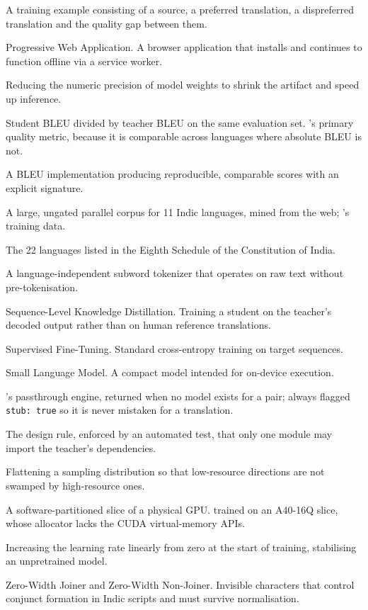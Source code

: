 {\begin{terms}
\item[Preference pair] A training example consisting of a source, a preferred translation, a dispreferred translation and the quality gap between them.
\item[PWA] Progressive Web Application. A browser application that installs and continues to function offline via a service worker.
\item[Quantisation] Reducing the numeric precision of model weights to shrink the artifact and speed up inference.
\item[Ratio (student/teacher)] Student BLEU divided by teacher BLEU on the same evaluation set. \setu{}'s primary quality metric, because it is comparable across languages where absolute BLEU is not.
\item[sacreBLEU] A BLEU implementation producing reproducible, comparable scores with an explicit signature.
\item[Samanantar] A large, ungated parallel corpus for 11 Indic languages, mined from the web; \setu{}'s training data.
\item[Scheduled languages] The 22 languages listed in the Eighth Schedule of the Constitution of India.
\item[SentencePiece] A language-independent subword tokenizer that operates on raw text without pre-tokenisation.
\item[\seqkd{}] Sequence-Level Knowledge Distillation. Training a student on the teacher's decoded output rather than on human reference translations.
\item[SFT] Supervised Fine-Tuning. Standard cross-entropy training on target sequences.
\item[SLM] Small Language Model. A compact model intended for on-device execution.
\item[Stub engine] \setu{}'s passthrough engine, returned when no model exists for a pair; always flagged \texttt{stub: true} so it is never mistaken for a translation.
\item[Teacher wall] The design rule, enforced by an automated test, that only one module may import the teacher's dependencies.
\item[Temperature sampling] Flattening a sampling distribution so that low-resource directions are not swamped by high-resource ones.
\item[vGPU] A software-partitioned slice of a physical GPU. \setu{} trained on an A40-16Q slice, whose allocator lacks the CUDA virtual-memory APIs.
\item[Warmup] Increasing the learning rate linearly from zero at the start of training, stabilising an unpretrained model.
\item[ZWJ / ZWNJ] Zero-Width Joiner and Zero-Width Non-Joiner. Invisible characters that control conjunct formation in Indic scripts and must survive normalisation.
\end{terms}
}
